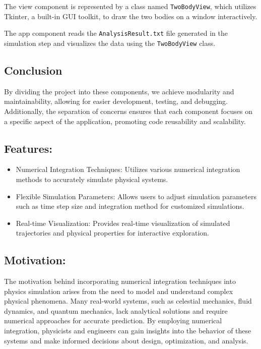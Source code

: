 \documentclass{article}
\begin{document}

The view component is represented by a class named \texttt{TwoBodyView}, which utilizes Tkinter, a built-in GUI toolkit, to draw the two bodies on a window interactively.


The app component reads the \texttt{AnalysisResult.txt} file generated in the simulation step and visualizes the data using the \texttt{TwoBodyView} class.

\subsection*{Conclusion}

By dividing the project into these components, we achieve modularity and maintainability, allowing for easier development, testing, and debugging. Additionally, the separation of concerns ensures that each component focuses on a specific aspect of the application, promoting code reusability and scalability.


\subsection*{Features:}
\begin{itemize}[label=-]
    \item Numerical Integration Techniques: Utilizes various numerical integration methods to accurately simulate physical systems.
    \item Flexible Simulation Parameters: Allows users to adjust simulation parameters such as time step size and integration method for customized simulations.
    \item Real-time Visualization: Provides real-time visualization of simulated trajectories and physical properties for interactive exploration.
\end{itemize}

\subsection*{Motivation:}
The motivation behind incorporating numerical integration techniques into physics simulation arises from the need to model and understand complex physical phenomena. Many real-world systems, such as celestial mechanics, fluid dynamics, and quantum mechanics, lack analytical solutions and require numerical approaches for accurate prediction. By employing numerical integration, physicists and engineers can gain insights into the behavior of these systems and make informed decisions about design, optimization, and analysis.
\end{document}
